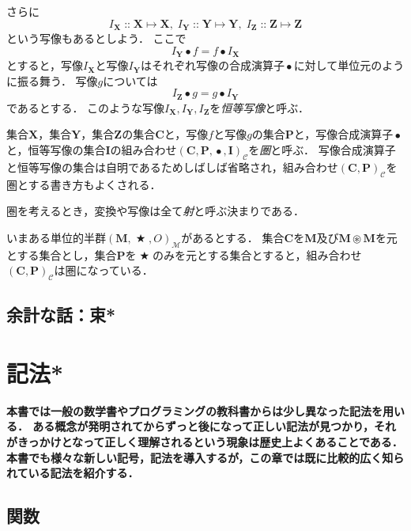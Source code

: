 \documentclass[twocolumn]{jsbook}
\newcommand{\keyword}[1]{\emph{#1}}
\newenvironment{leader}{\begingroup\bf}{\endgroup}
\DeclareMathOperator{\mathAnyBinaryOperator}{\bigstar}
\DeclareMathOperator{\mathCompose}{\bullet}
\DeclareMathOperator{\mathIn}{::}
\DeclareMathOperator{\mathMapsTo}{\mapsto}
\DeclareMathOperator{\mathSetTimes}{\circledast}
\newcommand{\mathSet}[1]{\mathbf{#1}}
\newcommand{\mathCategoryShort}[2]{(#1,#2)_\mathcal{C}}
\newcommand{\mathMorph}[2]{#1\mathMapsTo#2}
\newcommand{\mathMonoid}[3]{(#1,#2,#3)_\mathcal{M}}
\newcommand{\mathCategory}[4]{(#1,#2,#3,#4)_\mathcal{C}}
\begin{document}
さらに$$I_\mathSet{X}\mathIn\mathMorph{\mathSet{X}}{\mathSet{X}},\;I_\mathSet{Y}\mathIn\mathMorph{\mathSet{Y}}{\mathSet{Y}},\;I_\mathSet{Z}\mathIn\mathMorph{\mathSet{Z}}{\mathSet{Z}}$$という写像もあるとしよう．
ここで$$I_\mathSet{Y}\mathCompose f=f\mathCompose I_\mathSet{X}$$とすると，写像$I_\mathSet{X}$と写像$I_\mathSet{Y}$はそれぞれ写像の合成演算子$\mathCompose$に対して単位元のように振る舞う．
写像$g$については$$I_\mathSet{Z}\mathCompose g=g\mathCompose I_\mathSet{Y}$$であるとする．
このような写像$I_\mathSet{X},I_\mathSet{Y},I_\mathSet{Z}$を\keyword{恒等写像}と呼ぶ．

集合$\mathSet{X}$，集合$\mathSet{Y}$，集合$\mathSet{Z}$の集合$\mathSet{C}$と，写像$f$と写像$g$の集合$\mathSet{P}$と，写像合成演算子$\mathCompose$と，恒等写像の集合$\mathSet{I}$の組み合わせ$\mathCategory{\mathSet{C}}{\mathSet{P}}{\mathCompose}{\mathSet{I}}$を\keyword{圏}と呼ぶ．
写像合成演算子と恒等写像の集合は自明であるためしばしば省略され，組み合わせ$\mathCategoryShort{\mathSet{C}}{\mathSet{P}}$を圏とする書き方もよくされる．

圏を考えるとき，変換や写像は全て\keyword{射}と呼ぶ決まりである．

いまある単位的半群$\mathMonoid{\mathSet{M}}{\mathAnyBinaryOperator}{O}$があるとする．
集合$\mathSet{C}$を$\mathSet{M}$及び$\mathSet{M}\mathSetTimes\mathSet{M}$を元とする集合とし，集合$\mathSet{P}$を$\mathAnyBinaryOperator$のみを元とする集合とすると，組み合わせ$\mathCategoryShort{\mathSet{C}}{\mathSet{P}}$は圏になっている．

\section*{余計な話：束*}


\chapter{記法*}

\begin{leader}
本書では一般の数学書やプログラミングの教科書からは少し異なった記法を用いる．
ある概念が発明されてからずっと後になって正しい記法が見つかり，それがきっかけとなって正しく理解されるという現象は歴史上よくあることである．
本書でも様々な新しい記号，記法を導入するが，この章では既に比較的広く知られている記法を紹介する．
\end{leader}


\section{関数}
\end{document}
